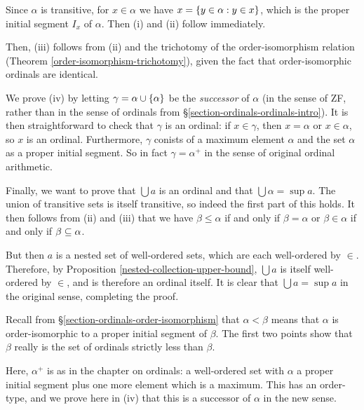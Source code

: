 \documentclass{article}
\begin{document}
\begin{prf}
    Since $\alpha$ is transitive, for $x \in \alpha$ we have $x = \left\lbrace y \in \alpha : y \in x \right\rbrace$, which is the proper initial segment $I_x$ of $\alpha$. Then (i) and (ii) follow immediately.
    
    Then, (iii) follows from (ii) and the trichotomy of the order-isomorphism relation (Theorem \ref{order-isomorphism-trichotomy}), given the fact that order-isomorphic ordinals are identical.
    
    We prove (iv) by letting $\gamma = \alpha \cup \left\lbrace \alpha \right\rbrace$ be the \textit{successor} of $\alpha$ (in the sense of ZF, rather than in the sense of ordinals from \S\ref{section-ordinals-ordinals-intro}). It is then straightforward to check that $\gamma$ is an ordinal: if $x \in \gamma$, then $x = \alpha$ or $x \in \alpha$, so $x$ is an ordinal. Furthermore, $\gamma$ conists of a maximum element $\alpha$ and the set $\alpha$ as a proper initial segment. So in fact $\gamma = \alpha^+$ in the sense of original ordinal arithmetic.
    
    Finally, we want to prove that $\bigcup a$ is an ordinal and that $\bigcup \alpha = \sup a$. The union of transitive sets is itself transitive, so indeed the first part of this holds. It then follows from (ii) and (iii) that we have $\beta \leq \alpha$ if and only if $\beta = \alpha$ or $\beta \in \alpha$ if and only if $\beta \subseteq \alpha$.
    
    But then $a$ is a nested set of well-ordered sets, which are each well-ordered by $\in$. Therefore, by Proposition \ref{nested-collection-upper-bound}, $\bigcup a$ is itself well-ordered by $\in$, and is therefore an ordinal itself. It is clear that $\bigcup a = \sup a$ in the original sense, completing the proof.
\end{prf}

\begin{note}
	Recall from \S\ref{section-ordinals-order-isomorphism} that $\alpha < \beta$ means that $\alpha$ is order-isomorphic to a proper initial segment of $\beta$. The first two points show that $\beta$ really is the set of ordinals strictly less than $\beta$.
\end{note}

\begin{note}
	Here, $\alpha^+$ is as in the chapter on ordinals: a well-ordered set with $\alpha$ a proper initial segment plus one more element which is a maximum. This has an order-type, and we prove here in (iv) that this is a successor of $\alpha$ in the new sense.
\end{note}
\end{document}
